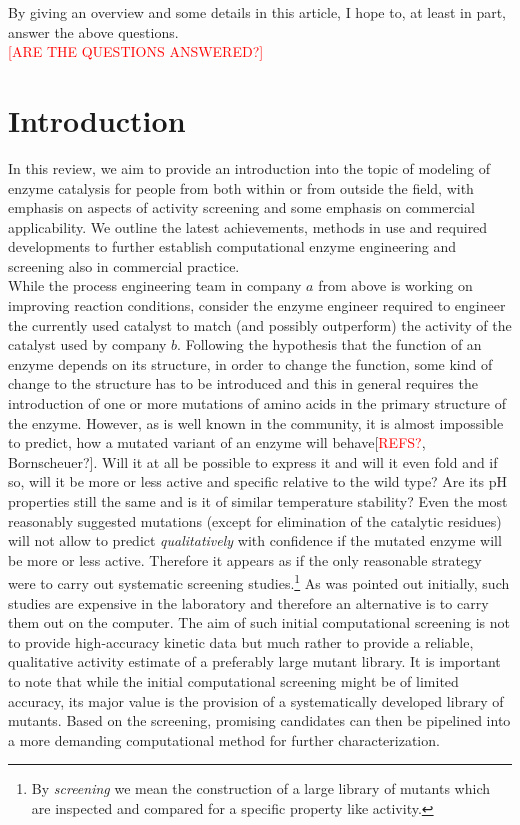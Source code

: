 By giving an overview and some details in this article, I hope to, at least in part, answer the above questions.\\
\textcolor{red}{[ARE THE QUESTIONS ANSWERED?]}


\section{Introduction}\label{sec:intro}
In this review, we aim to provide an introduction into the topic of modeling of enzyme catalysis for people from both within or from outside the field, with emphasis on aspects of activity screening and some emphasis on commercial applicability.
We outline the latest achievements, methods in use and required developments to further establish computational enzyme engineering and screening also in commercial practice.\\
While the process engineering team in company $a$ from above is working on improving reaction conditions, consider the enzyme engineer required to engineer the currently used catalyst to match (and possibly outperform) the activity of the catalyst used by company $b$.
Following the hypothesis that the function of an enzyme depends on its structure, in order to change the function, some kind of change to the structure has to be introduced and this in general requires the introduction of one or more mutations of amino acids in the primary structure of the enzyme.
However, as is well known in the community, it is almost impossible to predict, how a mutated variant of an enzyme will behave[\textcolor{red}{REFS?}, Bornscheuer?].
Will it at all be possible to express it and will it even fold and if so, will it be more or less active and specific relative to the wild type?
Are its pH properties still the same and is it of similar temperature stability?
Even the most reasonably suggested mutations (except for elimination of the catalytic residues) will not allow to predict \textit{qualitatively} with confidence if the mutated enzyme will be more or less active.
Therefore it appears as if the only reasonable strategy were to carry out systematic screening studies.\footnote{By \textit{screening} we mean the construction of a large library of mutants which are inspected and compared for a specific property like activity.}
As was pointed out initially, such studies are expensive in the laboratory and therefore an alternative is to carry them out on the computer.
The aim of such initial computational screening is not to provide high-accuracy kinetic data but much rather to provide a reliable, qualitative activity estimate of a preferably large mutant library.
It is important to note that while the initial computational screening might be of limited accuracy, its major value is the provision of a systematically developed library of mutants.
Based on the screening, promising candidates can then be pipelined into a more demanding computational method for further characterization.


